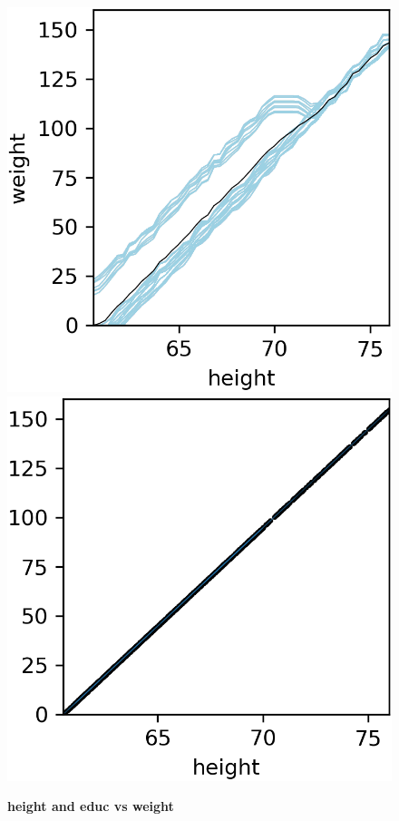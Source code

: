\documentclass[12pt]{article}
\begin{document}
\begin{figure}[htbp]
\begin{center}
\includegraphics[scale=0.7]{images/height_vs_weight_pdp.png}
\includegraphics[scale=0.7]{images/height_vs_weight_stratpd.png}
\caption{{\bf  height and educ vs weight}}
\label{fig:height_vs_weight}
\end{center}
\end{figure}
\end{document}
